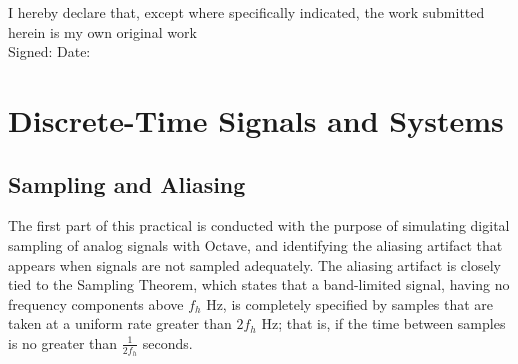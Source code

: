 \documentclass[a4paper, 12pt]{report}
\begin{document}
	\begin{titlepage}
		\vspace*{1.5cm}
		\vspace*{1.5cm}
		\vspace*{1.5cm}
		\vspace*{0.5cm}
		\vspace*{0.1cm}
		\vspace*{0.1cm}
		\vspace*{0.1cm}
		\makebox[\textwidth]{\today}
		\vfill
		\noindent I hereby declare that, except where specifically indicated, the work submitted herein is my own original work\\
		Signed: \hspace*{5cm} Date:
	\end{titlepage}

	\tableofcontents
	\newpage

	\chapter{Discrete-Time Signals and Systems} %
	\label{cha:discrete_time_signals_and_systems}
		\section{Sampling and Aliasing} %
		\label{sec:sampling_and_aliasing}
			The first part of this practical is conducted with the purpose of simulating digital sampling of analog signals with Octave, and identifying the aliasing artifact that appears when signals are not sampled adequately. The aliasing artifact is closely tied to the Sampling Theorem, which states that a band-limited signal, having no frequency components above $f_h$ Hz, is completely specified by samples that are taken at a uniform rate greater than $2f_h$ Hz; that is, if the time between samples is no greater than $\frac{1}{2f_h}$ seconds.
\end{document}
